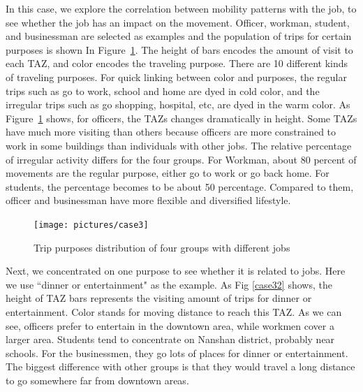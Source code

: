 In this case, we explore the correlation between mobility patterns with the job, to see whether the job has an impact on the movement. Officer, workman, student, and businessman are selected as examples and the population of trips for certain purposes is shown In Figure~\ref{case3}. The height of bars encodes the amount of visit to each TAZ, and color encodes the traveling purpose. There are 10 different kinds of traveling purposes. For quick linking between color and purposes, the regular trips such as go to work, school and home are dyed in cold color, and the irregular trips such as go shopping, hospital, etc, are dyed in the warm color. As Figure~\ref{case3} shows, for officers, the TAZs changes dramatically in height. Some TAZs have much more visiting than others because officers are more constrained to work in some buildings than individuals with other jobs. The relative percentage of irregular activity differs for the four groups. For Workman, about 80 percent of movements are the regular purpose, either go to work or go back home. For students, the percentage becomes to be about 50 percentage. Compared to them, officer and businessman have more flexible and diversified lifestyle.

\begin{figure}[htb!]
 \centering %
 \texttt{[image: pictures/case3]}
 \caption{Trip purposes distribution of four groups with different jobs}
 \label{case3}
\end{figure}

Next, we concentrated on one purpose to see whether it is related to jobs. Here we use ``dinner or entertainment" as the example. As Fig \ref{case32} shows, the height of TAZ bars represents the visiting amount of trips for dinner or entertainment. Color stands for moving distance to reach this TAZ. As we can see, officers prefer to entertain in the downtown area, while workmen cover a larger area. Students tend to concentrate on Nanshan district, probably near schools. For the businessmen, they go lots of places for dinner or entertainment. The biggest difference with other groups is that they would travel a long distance to go somewhere far from downtown areas.

